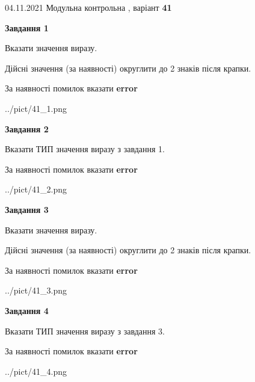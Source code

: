 \documentclass[11pt, ukrainian]{article}
\begin{document}
{04.11.2021 Модульна контрольна , варіант  \No \textbf { 41 }\par}
{
\begin {large}
{\begin {center}\textbf{Завдання 1}\end {center}}\par
Вказати значення виразу. \par
Дійсні значення (за наявності) округлити до 2 знаків після крапки. \par
За наявності помилок вказати \textbf{error}

\begin{center}
	{../pict/41_1.png}
\end{center}
\newpage

{\begin {center}\textbf{Завдання 2}\end {center}}\par
Вказати ТИП значення виразу з завдання 1. \par
За наявності помилок вказати \textbf{error}

\begin{center}
	{../pict/41_2.png}
\end{center}
\newpage

{\begin {center}\textbf{Завдання 3}\end {center}}\par
Вказати значення виразу. \par
Дійсні значення (за наявності) округлити до 2 знаків після крапки. \par
За наявності помилок вказати \textbf{error}

\begin{center}
	{../pict/41_3.png}
\end{center}
\newpage

{\begin {center}\textbf{Завдання 4}\end {center}}\par
Вказати ТИП значення виразу з завдання 3. \par
За наявності помилок вказати \textbf{error}

\begin{center}
	{../pict/41_4.png}
\end{center}
\newpage


\end{large}}
\end{document}
